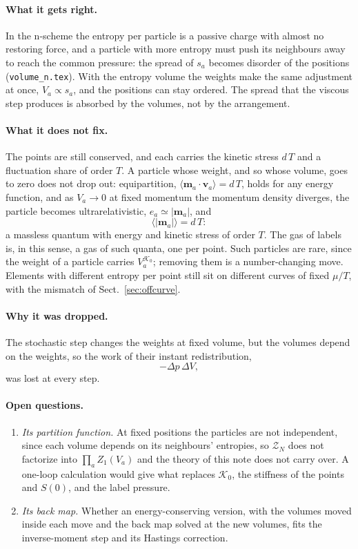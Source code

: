 \documentclass[11pt,aps,preprint,nofootinbib,superscriptaddress,tightenlines]{revtex4-2}
\newcommand{\avg}[1]{\langle #1\rangle}
\def\st{\begin{equation}}
\def\stp{\end{equation}}
\def\Sect#1{Sect.~\ref{#1}}
\let\oldparagraph\paragraph
\renewcommand{\paragraph}{\par\bigskip\oldparagraph}
\begin{document}
\paragraph{What it gets right.}  In the n-scheme the entropy per particle is a passive charge with almost no restoring force, and a particle with more entropy
must push its neighbours away to reach the common pressure: the spread of $s_a$ becomes disorder of the positions (\texttt{volume\_n.tex}).  With the entropy
volume the weights make the same adjustment at once, $V_a\propto s_a$, and the positions can stay ordered.  The spread that the viscous step produces is absorbed
by the volumes, not by the arrangement.

\paragraph{What it does not fix.}  The points are still conserved, and each carries the kinetic stress $d\,T$ and a fluctuation share of order $T$.  A particle
whose weight, and so whose volume, goes to zero does not drop out: equipartition, $\avg{\bm m_a\cdot\bm v_a}=d\,T$, holds for any energy function, and as
$V_a\to0$ at fixed momentum the momentum density diverges, the particle becomes ultrarelativistic, $e_a\simeq|\bm m_a|$, and
\st
\avg{|\bm m_a|}=d\,T :
\stp
a massless quantum with energy and kinetic stress of order $T$.  The gas of labels is, in this sense, a gas of such quanta, one per point.  Such particles
are rare, since the weight of a particle carries $V_a^{\mathcal K_0}$; removing them is a number-changing move.  Elements with
different entropy per point still sit on different curves of fixed $\mu/T$, with the mismatch of \Sect{sec:offcurve}.

\paragraph{Why it was dropped.}  The stochastic step changes the weights at fixed volume, but the volumes depend on the weights, so the work of their instant
redistribution,
\st
-\Delta p\,\Delta V ,
\stp
was lost at every step.

\paragraph{Open questions.}
\begin{enumerate}
\item \emph{Its partition function.}  At fixed positions the particles are not independent, since each volume depends on its neighbours' entropies, so $\mathcal Z_N$
  does not factorize into $\prod_aZ_1(V_a)$ and the theory of this note does not carry over.  A one-loop calculation would give what replaces $\mathcal K_0$, the
  stiffness of the points and $S(0)$, and the label pressure.
\item \emph{Its back map.}  Whether an energy-conserving version, with the volumes moved inside each move and the back map solved at the new volumes, fits the
  inverse-moment step and its Hastings correction.
\end{enumerate}
\end{document}
